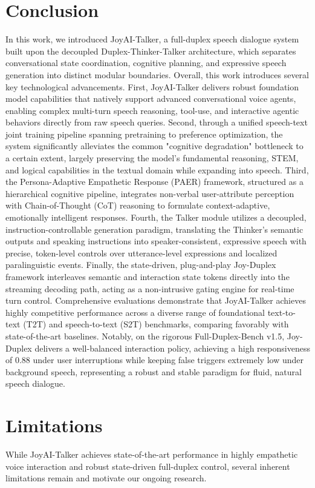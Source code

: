 \section{Conclusion}

In this work, we introduced JoyAI-Talker, a full-duplex speech dialogue system built upon the decoupled Duplex-Thinker-Talker architecture, which separates conversational state coordination, cognitive planning, and expressive speech generation into distinct modular boundaries. Overall, this work introduces several key technological advancements. First, JoyAI-Talker delivers robust foundation model capabilities that natively support advanced conversational voice agents, enabling complex multi-turn speech reasoning, tool-use, and interactive agentic behaviors directly from raw speech queries. Second, through a unified speech-text joint training pipeline spanning pretraining to preference optimization, the system significantly alleviates the common "cognitive degradation" bottleneck to a certain extent, largely preserving the model's fundamental reasoning, STEM, and logical capabilities in the textual domain while expanding into speech. Third, the Persona-Adaptive Empathetic Response (PAER) framework, structured as a hierarchical cognitive pipeline, integrates non-verbal user-attribute perception with Chain-of-Thought (CoT) reasoning to formulate context-adaptive, emotionally intelligent responses. Fourth, the Talker module utilizes a decoupled, instruction-controllable generation paradigm, translating the Thinker's semantic outputs and speaking instructions into speaker-consistent, expressive speech with precise, token-level controls over utterance-level expressions and localized paralinguistic events. Finally, the state-driven, plug-and-play Joy-Duplex framework  interleaves semantic and interaction state tokens directly into the streaming decoding path, acting as a non-intrusive gating engine for real-time turn control. Comprehensive evaluations demonstrate that JoyAI-Talker achieves highly competitive performance across a diverse range of foundational text-to-text (T2T) and speech-to-text (S2T) benchmarks, comparing favorably with state-of-the-art baselines. Notably, on the rigorous Full-Duplex-Bench v1.5, Joy-Duplex delivers a well-balanced interaction policy, achieving a high responsiveness of $0.88$ under user interruptions while keeping false triggers extremely low under background speech, representing a robust and stable paradigm for fluid, natural speech dialogue.
\section{Limitations}
While JoyAI-Talker achieves state-of-the-art performance in highly empathetic voice interaction and robust state-driven full-duplex control, several inherent limitations remain and motivate our ongoing research.

